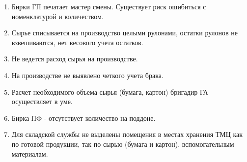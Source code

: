 \begin{enumerate}

\item  Бирки ГП печатает мастер смены. Существует риск ошибиться с номенклатурой и количеством.

\item Сырье списывается на производство целыми рулонами, остатки рулонов не взвешиваются, нет весового учета остатков.

\item Не ведется расход сырья на производстве.

\item На производстве не выявлено четкого учета брака.

\item  Расчет необходимого объема сырья (бумага, картон) бригадир ГА осуществляет в уме.

\item  Бирка ПФ - отсутствует количество на поддоне.

\item  Для складской службы не выделены помещения в местах хранения ТМЦ как по готовой продукции, так по сырью (бумага и картон), вспомогательным материалам.










\end{enumerate}
